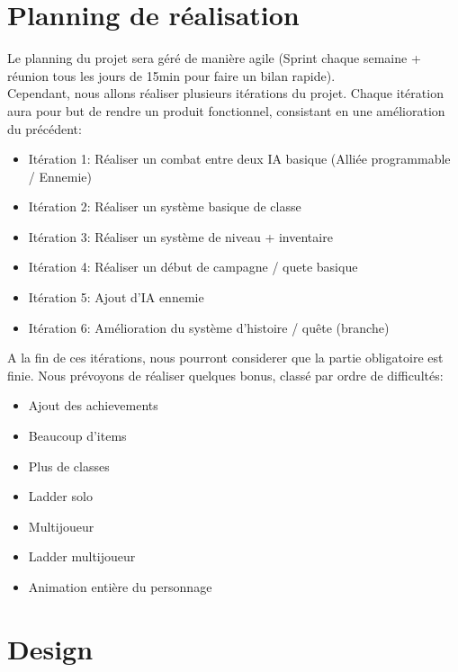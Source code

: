 \documentclass[16pt, oneside]{report}
\begin{document}
\chapter{Planning de r\'ealisation}
Le planning du projet sera g\'er\'e de mani\`ere agile (Sprint chaque semaine + r\'eunion tous les jours de 15min pour faire un bilan rapide).\\
Cependant, nous allons r\'ealiser plusieurs it\'erations du projet. Chaque it\'eration aura pour but de rendre un produit fonctionnel, consistant en une am\'elioration du pr\'ec\'edent:
\begin{itemize}
	\item It\'eration 1: R\'ealiser un combat entre deux IA basique (Alli\'ee programmable / Ennemie)
	\item It\'eration 2: R\'ealiser un syst\`eme basique de classe 
	\item It\'eration 3: R\'ealiser un syst\`eme de niveau + inventaire
	\item It\'eration 4: R\'ealiser un d\'ebut de campagne / quete basique
	\item It\'eration 5: Ajout d'IA ennemie
	\item It\'eration 6: Am\'elioration du syst\`eme d'histoire / qu\^ete (branche)\\

\end{itemize}
A la fin de ces it\'erations, nous pourront considerer que la partie obligatoire est finie. Nous pr\'evoyons de r\'ealiser quelques bonus, class\'e par ordre de difficult\'es:
\begin{itemize}
	\item Ajout des achievements
	\item Beaucoup d'items
	\item Plus de classes
	\item Ladder solo
	\item Multijoueur
	\item Ladder multijoueur
	\item Animation enti\`ere du personnage
\end{itemize}

\chapter{Design}
\end{document}
